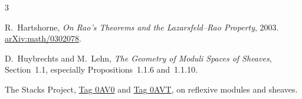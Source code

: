 \documentclass[11pt,a4paper]{article}
\theoremstyle{remark}
\begin{document}
\begin{thebibliography}{3}
\raggedright
{}
R.~Hartshorne,
\emph{On Rao's Theorems and the
Lazarsfeld--Rao Property}, 2003.
\href{https://arxiv.org/abs/math/0302078}
{arXiv:math/0302078}.

D.~Huybrechts and M.~Lehn,
\emph{The Geometry of Moduli Spaces
of Sheaves}, Section~1.1,
especially Propositions~1.1.6 and~1.1.10.

The Stacks Project,
\href{https://stacks.math.columbia.edu/tag/0AV0}
{Tag 0AV0} and
\href{https://stacks.math.columbia.edu/tag/0AVT}
{Tag 0AVT}, on reflexive modules and
sheaves.
\end{thebibliography}
\end{document}

